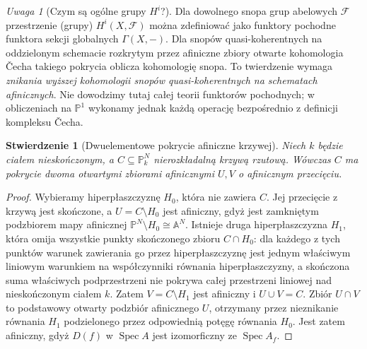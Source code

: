 \documentclass[11pt,a4paper,openany]{report}
\numberwithin{equation}{section}
\theoremstyle{plain}
\newtheorem{stwierdzenie}[twierdzenie]{Stwierdzenie}
\theoremstyle{definition}
\theoremstyle{remark}
\newtheorem{uwaga}[twierdzenie]{Uwaga}
\newcommand{\A}{\mathbb A}
\newcommand{\PP}{\mathbb P}
\newcommand{\Spec}{\operatorname{Spec}}
\begin{document}
\begin{uwaga}[Czym są ogólne grupy $H^i$?]
Dla dowolnego snopa grup abelowych $\mathcal F$
przestrzenie (grupy) $H^i(X,\mathcal F)$
można zdefiniować jako funktory pochodne funktora
sekcji globalnych $\Gamma(X,-)$. Dla snopów
quasi-koherentnych na oddzielonym schemacie
rozkrytym przez afiniczne zbiory otwarte kohomologia
Čecha takiego pokrycia oblicza kohomologię snopa.
To twierdzenie wymaga \emph{znikania wyższej kohomologii
snopów quasi-koherentnych na schematach afinicznych}.
Nie dowodzimy tutaj całej teorii funktorów pochodnych;
w obliczeniach na $\PP^1$ wykonamy jednak każdą
operację bezpośrednio z definicji kompleksu Čecha.
\end{uwaga}

\begin{stwierdzenie}[Dwuelementowe pokrycie afiniczne krzywej]
Niech $k$ będzie ciałem nieskończonym, a
$C\subseteq\PP^N_k$ nierozkładalną krzywą rzutową.
Wówczas $C$ ma pokrycie dwoma otwartymi zbiorami
afinicznymi $U,V$ o afinicznym przecięciu.
\end{stwierdzenie}
\begin{proof}
Wybieramy hiperpłaszczyznę $H_0$, która nie zawiera
$C$. Jej przecięcie z krzywą jest skończone,
a $U=C\setminus H_0$ jest afiniczny, gdyż
jest zamkniętym podzbiorem mapy afinicznej
$\PP^N\setminus H_0\cong\A^N$.
Istnieje druga hiperpłaszczyzna $H_1$, która
omija wszystkie punkty skończonego zbioru
$C\cap H_0$: dla każdego z tych punktów
warunek zawierania go przez hiperpłaszczyznę
jest jednym właściwym liniowym warunkiem na
współczynniki równania hiperpłaszczyzny,
a skończona suma właściwych podprzestrzeni
nie pokrywa całej przestrzeni liniowej nad
nieskończonym ciałem $k$.
Zatem $V=C\setminus H_1$ jest afiniczny i
$U\cup V=C$. Zbiór $U\cap V$ to podstawowy
otwarty podzbiór afinicznego $U$, otrzymany
przez nieznikanie równania $H_1$ podzielonego
przez odpowiednią potęgę równania $H_0$.
Jest zatem afiniczny, gdyż $D(f)$ w
$\Spec A$ jest izomorficzny ze $\Spec A_f$.
\end{proof}
\end{document}
